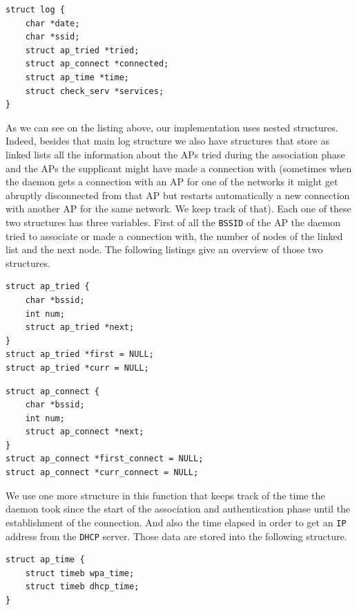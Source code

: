 \begin{lstlisting}[frame=single,breaklines=true,caption={Log structure}]
struct log {
	char *date;
	char *ssid;
	struct ap_tried *tried;
	struct ap_connect *connected;
	struct ap_time *time;
	struct check_serv *services;
}
\end{lstlisting}

As we can see on the listing above, our implementation uses nested structures. Indeed, besides that main log structure we also have structures that store as linked lists all the information about the APs tried during the association phase and the APs the supplicant might have made a connection with (sometimes when the daemon gets a connection with an AP for one of the networks it might get abruptly disconnected from that AP but restarts automatically a new connection with another AP for the same network. We keep track of that). Each one of these two structures has three variables. First of all the \texttt{BSSID} of the AP the daemon tried to associate or made a connection with, the number of nodes of the linked list and the next node. The following listings give an overview of those two structures.\\

\begin{lstlisting}[frame=single,breaklines=true,caption={Tried APs structure}]
struct ap_tried {
	char *bssid;
	int num;
	struct ap_tried *next;
}
struct ap_tried *first = NULL;
struct ap_tried *curr = NULL;
\end{lstlisting}

\begin{lstlisting}[frame=single,breaklines=true,caption={Connected APs structure}]
struct ap_connect {
	char *bssid;
	int num;
	struct ap_connect *next;
}
struct ap_connect *first_connect = NULL;
struct ap_connect *curr_connect = NULL;
\end{lstlisting}



We use one more structure in this function that keeps track of the time the daemon took since the start of the association and authentication phase until the establishment of the connection. And also the time elapsed in order to get an \texttt{IP} address from the \texttt{DHCP} server. Those data are stored into the following structure.\\

\begin{lstlisting}[frame=single,breaklines=true,caption={Elapsed time structure}]
struct ap_time {
	struct timeb wpa_time;
	struct timeb dhcp_time;
}
\end{lstlisting}

